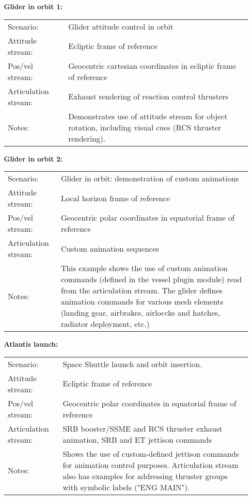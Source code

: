 \documentclass[Orbiter Technical Reference.tex]{subfiles}
\begin{document}
\noindent
\textbf{Glider in orbit 1:}
\begin{table}[H]
	\centering
	\begin{tabularx}{\textwidth}{ l X }
	Scenario: & Glider attitude control in orbit\\
	Attitude stream: & Ecliptic frame of reference\\
	Pos/vel stream: & Geocentric cartesian coordinates in ecliptic frame of reference\\
	Articulation stream: & Exhaust rendering of reaction control thrusters\\
	Notes: & Demonstrates use of attitude stream for object rotation, including visual cues (RCS thruster rendering).\\
	\end{tabularx}
\end{table}

\noindent
\textbf{Glider in orbit 2:}
\begin{table}[H]
	\centering
	\begin{tabularx}{\textwidth}{ l X }
	Scenario: & Glider in orbit: demonstration of custom animations\\
	Attitude stream: & Local horizon frame of reference\\
	Pos/vel stream: & Geocentric polar coordinates in equatorial frame of reference\\
	Articulation stream: & Custom animation sequences\\
	Notes: & This example shows the use of custom animation commands (defined in the vessel plugin module) read from the articulation stream. The glider defines animation commands for various mesh elements (landing gear, airbrakes, airloccks and hatches, radiator deployment, etc.)\\
	\end{tabularx}
\end{table}

\noindent
\textbf{Atlantis launch:}
\begin{table}[H]
	\centering
	\begin{tabularx}{\textwidth}{ l X }
	Scenario: & Space Shuttle launch and orbit insertion.\\
	Attitude stream: & Ecliptic frame of reference\\
	Pos/vel stream: & Geocentric polar coordinates in equatorial frame of reference\\
	Articulation stream: & SRB booster/SSME and RCS thruster exhaust animation, SRB and ET jettison commands\\
	Notes: & Shows the use of custom-defined jettison commands for animation control purposes. Articulation stream also has examples for addressing thruster groups with symbolic labels ("ENG MAIN").\\
	\end{tabularx}
\end{table}
\end{document}
